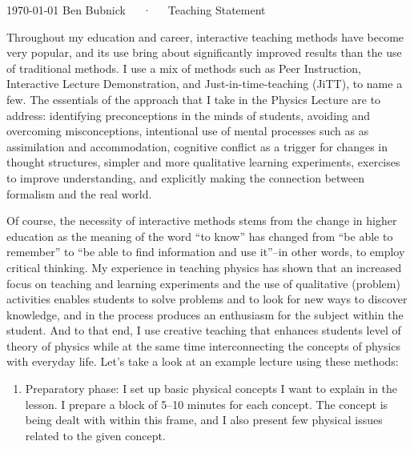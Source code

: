 \documentclass[11pt, a4paper]{awesome-cv}
\begin{document}

\makecvfooter
  {\today}
  {Ben Bubnick~~~·~~~Teaching Statement}
  {}

\makelettertitle

\begin{cvletter}

Throughout my education and career, interactive teaching methods have become very popular, and its use bring about significantly improved results than the use of traditional methods.  I use a mix of methods such as Peer Instruction, Interactive Lecture Demonstration, and Just-in-time-teaching (JiTT), to name a few.  The essentials of the approach that I take in the Physics Lecture are to address: identifying preconceptions in the minds of students, avoiding and overcoming misconceptions, intentional use of mental processes such as as assimilation and accommodation, cognitive conflict as a trigger for changes in thought structures, simpler and more qualitative learning experiments, exercises to improve understanding, and explicitly making the connection between formalism and the real world.  

Of course, the necessity of interactive methods stems from the change in higher education as the meaning of the word “to know” has changed from “be able to remember” to “be able to find information and use it”--in other words, to employ critical thinking.  My experience in teaching physics has shown that an increased focus on teaching and learning experiments and the use of qualitative (problem) activities enables students to solve problems and to look for new ways to discover knowledge, and in the process produces an enthusiasm for the subject within the student.  And to that end, I use creative teaching that enhances students level of theory of physics while at the same time interconnecting the concepts of physics with everyday life.  Let's take a look at an example lecture using these methods:

\begin{enumerate}

	\item Preparatory phase: I set up basic physical concepts I want to explain in the lesson. I prepare a block of 5–10 minutes for each concept. The concept is being dealt with within this frame, and I also present few physical issues related to the given concept.


\end{enumerate}
\end{cvletter}
\end{document}
